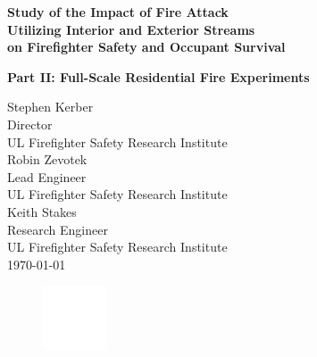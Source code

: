 \documentclass{article}
\begin{document}
	
	\begin{titlepage}
		
		\pagecolor{ULred}\afterpage{\nopagecolor}
		


			\vspace*{20\baselineskip} 

		\huge
		\begin{adjustwidth}{-0.5in}{-0in}
		\color{white}
		\textbf{Study of the Impact of Fire Attack \\ Utilizing Interior and Exterior Streams \\ on Firefighter Safety and Occupant Survival}
		\end{adjustwidth}
		\huge
		\begin{adjustwidth}{-0.5in}{-0in}
		\color{white}
		\textbf{Part II: Full-Scale Residential Fire Experiments}
		\end{adjustwidth}
		\begin{adjustwidth}{-0.5in}{}
		\color{white}
		\vspace{.2\baselineskip}
		\large
		Stephen Kerber \\
		Director \\
		UL Firefighter Safety Research Institute \\
		\vspace*{.5\baselineskip}
		Robin Zevotek \\
		Lead Engineer \\
		UL Firefighter Safety Research Institute \\ 
		\vspace*{.5\baselineskip}
		Keith Stakes \\
		Research Engineer \\
		UL Firefighter Safety Research Institute \\
		\vspace*{.8\baselineskip}	
		\today
		\vspace*{.8\baselineskip}
		\begin{figure}[h]
			\hspace*{-0.5in}\includegraphics[width=0.75in]{0_Images/ULLogoWhite.pdf}
		\end{figure}
		\end{adjustwidth}
	\end{titlepage}
\end{document}
